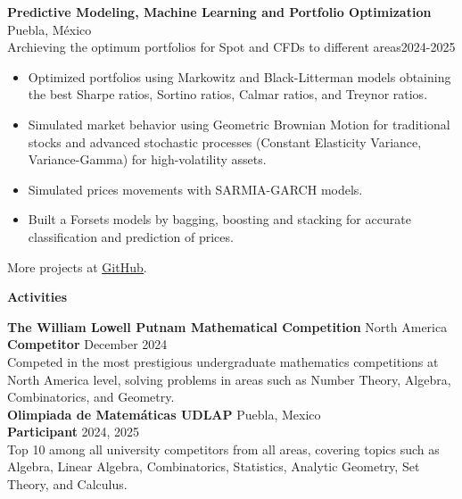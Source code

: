 \documentclass[9pt]{extarticle} %
\begin{document}
\textbf{Predictive Modeling, Machine Learning and Portfolio Optimization}  \hfill Puebla, México\\
Archieving the optimum portfolios for Spot and CFDs to different areas\hfill 2024-2025
\begin{itemize}[noitemsep, topsep=0pt, partopsep=0pt, parsep=0pt]
    \item Optimized portfolios using Markowitz and Black-Litterman models obtaining the best Sharpe ratios, Sortino ratios, Calmar ratios, and Treynor ratios.
    \item Simulated market behavior using Geometric Brownian Motion for traditional stocks and advanced stochastic processes (Constant Elasticity Variance, Variance-Gamma) for high-volatility assets. 
    \item Simulated prices movements with SARMIA-GARCH models.
    \item Built a Forsets models by bagging, boosting and stacking for accurate classification and prediction of prices.
\end{itemize}  
More projects at \href{https://github.com/heritaco}{\textcolor{customblue}{\underline{GitHub}}}.











\begin{center}
    \vspace{1ex}
    \textbf{Activities}
    \vspace{-1ex}
\end{center}

\textbf{The William Lowell Putnam Mathematical Competition} \hfill North America\\
\textbf{Competitor} \hfill December 2024\\
Competed in the most prestigious undergraduate mathematics competitions at North America level, solving  problems in areas such as Number Theory, Algebra, Combinatorics, and Geometry.\\

\textbf{Olimpiada de Matemáticas UDLAP} \hfill Puebla, Mexico\\
\textbf{Participant} \hfill 2024, 2025\\
Top 10 among all university competitors from all areas, covering topics such as Algebra, Linear Algebra, Combinatorics, Statistics, Analytic Geometry, Set Theory, and Calculus.\\
\end{document}

